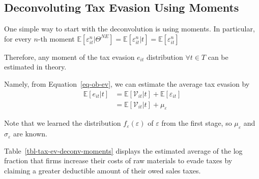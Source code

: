 \documentclass[
  12pt]{article}
\theoremstyle{definition}
\theoremstyle{remark}
\begin{document}
\subsection{Deconvoluting Tax Evasion Using
Moments}\label{deconvoluting-tax-evasion-using-moments}

One simple way to start with the deconvolution is using moments. In
particular, for every \(n\)-th moment
\(\mathbb{E}[\varepsilon_{it}^n|\Theta^{NE}]=\mathbb{E}[\varepsilon_{it}^n|t]=\mathbb{E}[\varepsilon_{it}^n]\)

Therefore, any moment of the tax evasion \(e_{it}\) distribution
\(\forall t\in T\) can be estimated in theory.

Namely, from Equation~\ref{eq-ob-ev}, we can estimate the average tax
evasion by \[
\begin{aligned}
  \mathbb{E}[e_{it}|t]&=\mathbb{E}[\mathcal V_{it}|t]+\mathbb{E}[\varepsilon_{it}]\\
  &=\mathbb{E}[\mathcal V_{it}|t]+\mu_{\varepsilon}
\end{aligned}
\]

Note that we learned the distribution \(f_\varepsilon(\varepsilon)\) of
\(\varepsilon\) from the first stage, so \(\mu_{\varepsilon}\) and
\(\sigma_{\varepsilon}\) are known.

Table~\ref{tbl-tax-ev-deconv-moments} displays the estimated average of
the log fraction that firms increase their costs of raw materials to
evade taxes by claiming a greater deductible amount of their owed sales
taxes.
\end{document}
